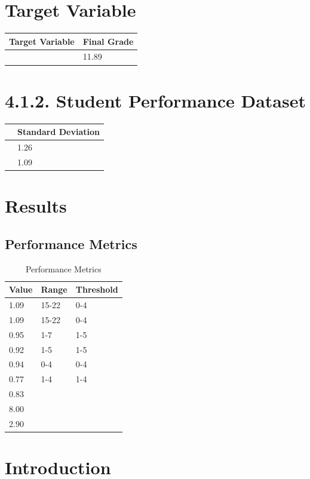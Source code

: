 \documentclass[twocolumn]{svjour3}
\begin{document}
\section{Target Variable}
\begin{tabular}{ll}
\hline
Target Variable & Final Grade \\
\hline
& 11.89 \\
\hline
\end{tabular}
\section{4.1.2. Student Performance Dataset}
\begin{tabular}{ll}
\hline
& Standard Deviation \\
\hline
& 1.26 \\
& 1.09 \\
\hline
\end{tabular}

\section{Results}
\subsection{Performance Metrics}
\begin{table}
\centering
\caption{Performance Metrics}
\begin{tabular}{lll}
\hline
Value & Range & Threshold \\
\hline
1.09 & 15-22 & 0-4 \\
1.09 & 15-22 & 0-4 \\
0.95 & 1-7 & 1-5 \\
0.92 & 1-5 & 1-5 \\
0.94 & 0-4 & 0-4 \\
0.77 & 1-4 & 1-4 \\
0.83 & & \\
8.00 & & \\
2.90 & & \\
\hline
\end{tabular}
\end{table}

\section{Introduction}
\end{document}

